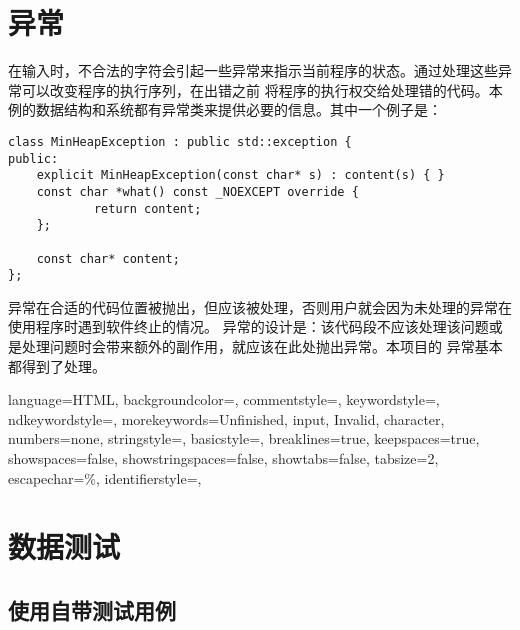 
\chapter{异常}
在输入时，不合法的字符会引起一些异常来指示当前程序的状态。通过处理这些异常可以改变程序的执行序列，在出错之前%
将程序的执行权交给处理错的代码。本例的数据结构和系统都有异常类来提供必要的信息。其中一个例子是：
\begin{lstlisting}[firstnumber=244, caption=HashTableException 异常类]
class MinHeapException : public std::exception {
public:
    explicit MinHeapException(const char* s) : content(s) { }
    const char *what() const _NOEXCEPT override {
            return content;
    };

    const char* content;
};
\end{lstlisting}

异常在合适的代码位置被抛出，但应该被处理，否则用户就会因为未处理的异常在使用程序时遇到软件终止的情况。%
异常的设计是：该代码段不应该处理该问题或是处理问题时会带来额外的副作用，就应该在此处抛出异常。本项目的%
异常基本都得到了处理。


 {
    language=HTML,
    backgroundcolor=\color{CPPDark},   
    commentstyle=\color{CPPLight},
    keywordstyle=\color{red},
    ndkeywordstyle={},
    morekeywords={Unfinished, input, Invalid, character},
    numbers=none,
    stringstyle={},
    basicstyle=\fira\color{white}\footnotesize,
    breaklines=true,                                     
    keepspaces=true,                                     
    showspaces=false,                
    showstringspaces=false,
    showtabs=false,                  
    tabsize=2,
    escapechar=\%,
    identifierstyle={},
}

\chapter{数据测试}

\section{使用自带测试用例}

